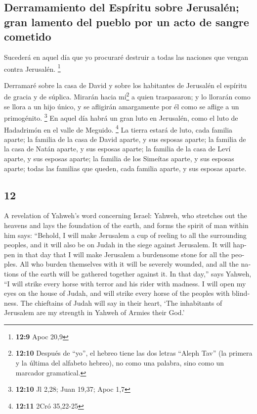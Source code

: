 \begin{paracol}{2}
\hypertarget{derramamiento-del-espuxedritu-sobre-jerusaluxe9n-gran-lamento-del-pueblo-por-un-acto-de-sangre-cometido}{%
\subsection{Derramamiento del Espíritu sobre Jerusalén; gran lamento del
pueblo por un acto de sangre
cometido}\label{derramamiento-del-espuxedritu-sobre-jerusaluxe9n-gran-lamento-del-pueblo-por-un-acto-de-sangre-cometido}}

 Sucederá en aquel día que yo procuraré destruir a todas
las naciones que vengan contra Jerusalén. \footnote{\textbf{12:9} Apoc
  20,9}

 Derramaré sobre la casa de David y sobre los habitantes
de Jerusalén el espíritu de gracia y de súplica. Mirarán hacia
mí\footnote{\textbf{12:10} Después de ``yo'', el hebreo tiene las dos
  letras ``Aleph Tav'' (la primera y la última del alfabeto hebreo), no
  como una palabra, sino como un marcador gramatical.} a quien
traspasaron; y lo llorarán como se llora a un hijo único, y se afligirán
amargamente por él como se aflige a un primogénito. \footnote{\textbf{12:10}
  Jl 2,28; Juan 19,37; Apoc 1,7}  En aquel día habrá un
gran luto en Jerusalén, como el luto de Hadadrimón en el valle de
Meguido. \footnote{\textbf{12:11} 2Cró 35,22-25}  La
tierra estará de luto, cada familia aparte; la familia de la casa de
David aparte, y sus esposas aparte; la familia de la casa de Natán
aparte, y sus esposas aparte;  la familia de la casa de
Leví aparte, y sus esposas aparte; la familia de los Simeítas aparte, y
sus esposas aparte;  todas las familias que queden, cada
familia aparte, y sus esposas aparte.

\switchcolumn
\begin{otherlanguage}{english}

\hypertarget{section-23}{%
\section{12}\label{section-23}}

 A revelation of Yahweh's word concerning Israel: Yahweh,
who stretches out the heavens and lays the foundation of the earth, and
forms the spirit of man within him says:  ``Behold, I will
make Jerusalem a cup of reeling to all the surrounding peoples, and it
will also be on Judah in the siege against Jerusalem.  It
will happen in that day that I will make Jerusalem a burdensome stone
for all the peoples. All who burden themselves with it will be severely
wounded, and all the nations of the earth will be gathered together
against it.  In that day,'' says Yahweh, ``I will strike
every horse with terror and his rider with madness. I will open my eyes
on the house of Judah, and will strike every horse of the peoples with
blindness.  The chieftains of Judah will say in their
heart, `The inhabitants of Jerusalem are my strength in Yahweh of Armies
their God.'


\end{otherlanguage}
\end{paracol}

